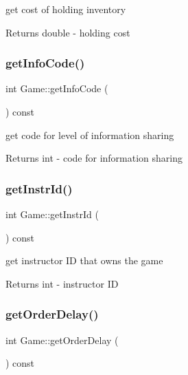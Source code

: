get cost of holding inventory \begin{DoxyReturn}{Returns}
double -\/ holding cost 
\end{DoxyReturn}
\mbox{\label{classGame_aafa386030ee084fe10699ec84316e689}} 
\subsubsection{\texorpdfstring{get\+Info\+Code()}{getInfoCode()}}
{\footnotesize\ttfamily int Game\+::get\+Info\+Code (\begin{DoxyParamCaption}{ }\end{DoxyParamCaption}) const}

get code for level of information sharing \begin{DoxyReturn}{Returns}
int -\/ code for information sharing 
\end{DoxyReturn}
\mbox{\label{classGame_a2fb39179e66606280c4d6408ffac0012}} 
\subsubsection{\texorpdfstring{get\+Instr\+Id()}{getInstrId()}}
{\footnotesize\ttfamily int Game\+::get\+Instr\+Id (\begin{DoxyParamCaption}{ }\end{DoxyParamCaption}) const}

get instructor ID that owns the game \begin{DoxyReturn}{Returns}
int -\/ instructor ID 
\end{DoxyReturn}
\mbox{\label{classGame_ab68ef87715311bea275bdac17342f2bd}} 
\subsubsection{\texorpdfstring{get\+Order\+Delay()}{getOrderDelay()}}
{\footnotesize\ttfamily int Game\+::get\+Order\+Delay (\begin{DoxyParamCaption}{ }\end{DoxyParamCaption}) const}

